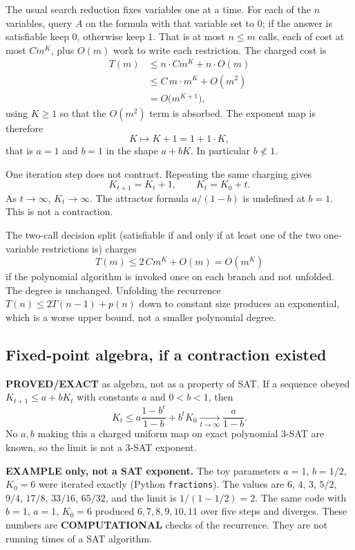 \documentclass[11pt]{article}
\begin{document}
The usual search reduction fixes variables one at a time. For each of the $n$ variables, query $A$ on the formula with that variable set to $0$; if the answer is satisfiable keep $0$, otherwise keep $1$. That is at most $n\le m$ calls, each of cost at most $C m^{K}$, plus $O(m)$ work to write each restriction. The charged cost is
\begin{align*}
T(m)
&\le n\cdot C m^{K} + n\cdot O(m) \\
&\le C\, m\cdot m^{K} + O(m^{2}) \\
&= O\bigl(m^{K+1}\bigr),
\end{align*}
using $K\ge 1$ so that the $O(m^{2})$ term is absorbed. The exponent map is therefore
\[
K\mapsto K+1 = 1 + 1\cdot K,
\]
that is $a=1$ and $b=1$ in the shape $a+bK$. In particular $b\not< 1$.

One iteration step does not contract. Repeating the same charging gives
\[
K_{t+1}=K_{t}+1,\qquad K_{t}=K_{0}+t.
\]
As $t\to\infty$, $K_{t}\to\infty$. The attractor formula $a/(1-b)$ is undefined at $b=1$. This is not a contraction.

The two-call decision split (satisfiable if and only if at least one of the two one-variable restrictions is) charges
\[
T(m)\le 2\, C m^{K}+O(m)=O(m^{K})
\]
if the polynomial algorithm is invoked once on each branch and not unfolded. The degree is unchanged. Unfolding the recurrence $T(n)\le 2T(n-1)+p(n)$ down to constant size produces an exponential, which is a worse upper bound, not a smaller polynomial degree.

\subsection*{Fixed-point algebra, if a contraction existed}
\label{sec:algebra}
\textbf{PROVED/EXACT} as algebra, not as a property of SAT. If a sequence obeyed $K_{t+1}\le a+b K_{t}$ with constants $a$ and $0<b<1$, then
\[
K_{t}\le a\frac{1-b^{t}}{1-b}+b^{t} K_{0}
\xrightarrow[t\to\infty]{}\frac{a}{1-b}.
\]
No $a,b$ making this a charged uniform map on exact polynomial 3-SAT are known, so the limit is not a 3-SAT exponent.

\textbf{EXAMPLE only, not a SAT exponent.} The toy parameters $a=1$, $b=1/2$, $K_{0}=6$ were iterated exactly (Python \texttt{fractions}). The values are $6$, $4$, $3$, $5/2$, $9/4$, $17/8$, $33/16$, $65/32$, and the limit is $1/(1-1/2)=2$. The same code with $b=1$, $a=1$, $K_{0}=6$ produced $6,7,8,9,10,11$ over five steps and diverges. These numbers are \textbf{COMPUTATIONAL} checks of the recurrence. They are not running times of a SAT algorithm.
\end{document}
